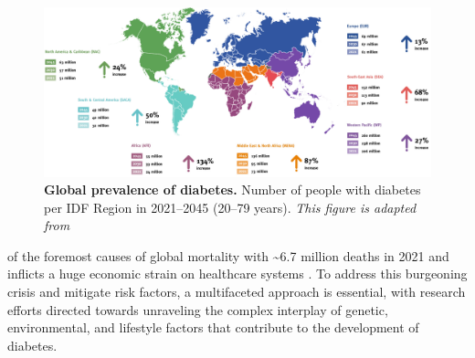 \begin{figure}[H]
\centering
\includegraphics[width=\linewidth]{Chapter1/Fig/F1-3-01.png}
\caption[Global prevalence of diabetes]{\textbf{Global prevalence of diabetes.} Number of people with diabetes per IDF Region in 2021–2045 (20–79 years). \textit{This figure is adapted from \textbf{\cite{home_idf_nodate}}}}
\label{fig:chp1_idf}
\end{figure}
of the foremost causes of global mortality with \textasciitilde6.7 million deaths in 2021 and inflicts a huge economic strain on healthcare systems  \textbf{\cite{home_idf_nodate}}. %
To address this burgeoning crisis and mitigate risk factors, a multifaceted approach is essential, with research efforts directed towards unraveling the complex interplay of genetic, environmental, and lifestyle factors that contribute to the development of diabetes.\\



